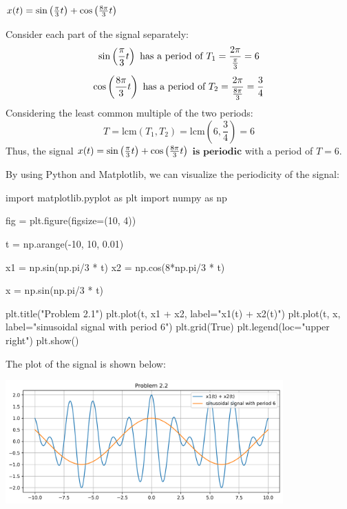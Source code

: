 \documentclass[a4paper, 10pt]{article}
\begin{document}
\begin{subproblems}
    \item \( x(t) = \sin \left( \frac{\pi}{3}t \right) + \cos \left( \frac{8\pi}{3}t \right) \)
\end{subproblems}

\begin{solution}
Consider each part of the signal separately:
\[
\sin \left( \frac{\pi}{3}t \right) \text{ has a period of } T_1 = \frac{2\pi}{\frac{\pi}{3}} = 6
\]
\[
\cos \left( \frac{8\pi}{3}t \right) \text{ has a period of } T_2 = \frac{2\pi}{\frac{8\pi}{3}} = \frac{3}{4}
\]
Considering the least common multiple of the two periods:
\[
T = \text{lcm}(T_1, T_2) = \text{lcm}(6, \frac{3}{4}) = 6
\]
Thus, the signal \( x(t) = \sin \left( \frac{\pi}{3}t \right) + \cos \left( \frac{8\pi}{3}t \right) \) \( \boxed{\textbf{is periodic}} \) with a period of \( \boxed{T = 6} \).

\vspace{5mm}

By using Python and Matplotlib, we can visualize the periodicity of the signal:
\begin{codingbox}
import matplotlib.pyplot as plt
import numpy as np

fig = plt.figure(figsize=(10, 4))

t = np.arange(-10, 10, 0.01)

x1 = np.sin(np.pi/3 * t)
x2 = np.cos(8*np.pi/3 * t)

x = np.sin(np.pi/3 * t)

plt.title("Problem 2.1")
plt.plot(t, x1 + x2, label="x1(t) + x2(t)")
plt.plot(t, x, label="sinusoidal signal with period 6")
plt.grid(True)
plt.legend(loc="upper right")
plt.show()
\end{codingbox}
The plot of the signal is shown below:
\begin{center}
    \includegraphics[width=0.8\textwidth]{images/problem_2_1.png}
\end{center}
\end{solution}
\end{document}
